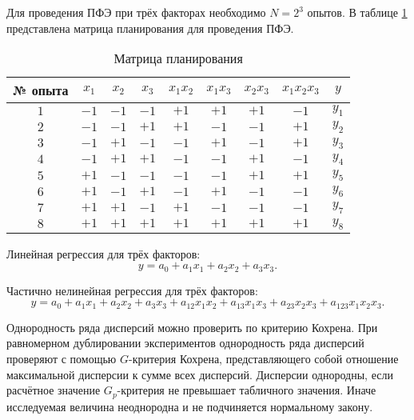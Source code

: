 \documentclass[a4paper, 14pt]{extreport}
\begin{document}
\begin{MainPart}
Для проведения ПФЭ при трёх факторах необходимо $N = 2^3$ опытов.
В таблице \ref{tbl:planning-matrix} представлена матрица планирования для проведения ПФЭ.

\begin{table}[ht]
	\centering
	\captionsetup{justification=centering}
	\caption{Матрица планирования}
	\label{tbl:planning-matrix}
	\begin{tabular}{|c|c|c|c|c|c|c|c|c|}
		\hline
		№ опыта & $x_1$ & $x_2$ & $x_3$ & $x_1x_2$ & $x_1x_3$ & $x_2x_3$ & $x_1x_2x_3$ & $y$   \\ \hline
		$1$     & $-1$  & $-1$  & $-1$  & $+1$     & $+1$     & $+1$     & $-1$        & $y_1$ \\ \hline
		$2$     & $-1$  & $-1$  & $+1$  & $+1$     & $-1$     & $-1$     & $+1$        & $y_2$ \\ \hline
		$3$     & $-1$  & $+1$  & $-1$  & $-1$     & $+1$     & $-1$     & $+1$        & $y_3$ \\ \hline
		$4$     & $-1$  & $+1$  & $+1$  & $-1$     & $-1$     & $+1$     & $-1$        & $y_4$ \\ \hline
		$5$     & $+1$  & $-1$  & $-1$  & $-1$     & $-1$     & $+1$     & $+1$        & $y_5$ \\ \hline
		$6$     & $+1$  & $-1$  & $+1$  & $-1$     & $+1$     & $-1$     & $-1$        & $y_6$ \\ \hline
		$7$     & $+1$  & $+1$  & $-1$  & $+1$     & $-1$     & $-1$     & $-1$        & $y_7$ \\ \hline
		$8$     & $+1$  & $+1$  & $+1$  & $+1$     & $+1$     & $+1$     & $+1$        & $y_8$ \\ \hline
	\end{tabular}
\end{table}

Линейная регрессия для трёх факторов:
\begin{equation}
	y = a_0 + a_1x_1 + a_2x_2 + a_3x_3.
\end{equation}

Частично нелинейная регрессия для трёх факторов:
\begin{equation}
	y = a_0 + a_1x_1 + a_2x_2 + a_3x_3 + a_{12}x_1x_2 + a_{13}x_1x_3 + a_{23}x_2x_3 + a_{123}x_1x_2x_3.
\end{equation}

Однородность ряда дисперсий можно проверить по критерию Кохрена.
При равномерном дублировании экспериментов однородность ряда дисперсий проверяют с помощью $G$-критерия Кохрена, представляющего собой отношение максимальной дисперсии к сумме всех дисперсий.
Дисперсии однородны, если расчётное значение $G_p$-критерия не превышает табличного значения.
Иначе исследуемая величина неоднородна и не подчиняется нормальному закону.


\end{MainPart}
\end{document}
